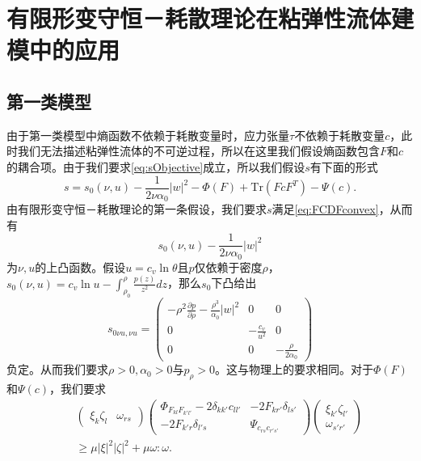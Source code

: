 \section{有限形变守恒－耗散理论在粘弹性流体建模中的应用}
\subsection{第一类模型}
由于第一类模型中熵函数不依赖于耗散变量时，应力张量$\tau$不依赖于耗散变量$c$，此时我们无法描述粘弹性流体的不可逆过程，所以在这里我们假设熵函数包含$F$和$c$的耦合项。由于我们要求\eqref{eq:sObjective}成立，所以我们假设$s$有下面的形式 
 $$s = s_0(\nu,u) - \frac{1}{2 \nu \alpha_0} |w|^2 - \Phi (F) + \mbox{Tr} (FcF^T) - \Psi(c) .$$
由有限形变守恒－耗散理论的第一条假设，我们要求$s$满足\eqref{eq:FCDFconvex}，从而有
\begin{equation*}
	s_0(\nu,u) - \frac{1}{2\nu \alpha_0}|w|^2
\end{equation*}
为$\nu,u$的上凸函数。假设$u = c_v \ln \theta$且$p$仅依赖于密度$\rho$，$s_0(\nu,u) = c_v \ln u - \int_{\rho_0}^\rho \frac{p(z)}{z^2}dz$，那么$s_0$下凸给出
\begin{equation*}
	s_{0\nu u,\nu u} = \left( \begin{array}{ccc}
		- \rho^2 \frac{\partial p}{\partial \rho} - \frac{\rho^3}{\alpha_0}|w|^2 & 0 & 0 \\
		0 & -\frac{c_v}{u^2} & 0 \\
		0 & 0 & -\frac{\rho}{2\alpha_0}
	\end{array}\right)
\end{equation*}
负定。从而我们要求$\rho>0,\alpha_0>0$与$p_\rho>0$。这与物理上的要求相同。对于$\Phi(F)$和$\Psi(c)$，我们要求
\begin{eqnarray*}
	&&\left( \begin{array}{cc}
		\xi_k \zeta_l & \omega_{rs} 
	\end{array}\right)
	\left( \begin{array}{cc}
		\Phi_{F_{kl}F_{k'l'}} - 2\delta_{kk'} c_{ll'}& -2 F_{kr'} \delta_{ls'} \\
		-2 F_{k'r} \delta_{l's} & \Psi_{c_{rs}c_{r's'}}
	\end{array}\right) 
	\left( \begin{array}{c}
		\xi_{k'}  \zeta_{l'} \\ \omega_{s'r'} 
	\end{array}\right) \\
	&&\ge \mu |\xi|^2|\zeta|^2 + \mu \omega:\omega.
\end{eqnarray*}

